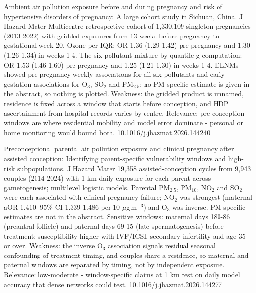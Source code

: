 \documentclass[10pt]{article}
\begin{document}
\par{}\baselineskip{}\baselineskip
{}

{Ambient air pollution exposure before and during pregnancy and risk of hypertensive disorders of pregnancy: A large cohort study in Sichuan, China.}
{J Hazard Mater}
{Multicentre retrospective cohort of 1,330,109 singleton pregnancies (2013-2022) with gridded exposures from 13 weeks before pregnancy to gestational week 20. Ozone per IQR: OR 1.36 (1.29-1.42) pre-pregnancy and 1.30 (1.26-1.34) in weeks 1-4. The six-pollutant mixture by quantile g-computation: OR 1.53 (1.46-1.60) pre-pregnancy and 1.25 (1.21-1.30) in weeks 1-4. DLNMs showed pre-pregnancy weekly associations for all six pollutants and early-gestation associations for O$_3$, SO$_2$ and PM$_{2.5}$; no PM-specific estimate is given in the abstract, so nothing is plotted. Weakness: the gridded product is unnamed, residence is fixed across a window that starts before conception, and HDP ascertainment from hospital records varies by centre. Relevance: pre-conception windows are where residential mobility and model error dominate - personal or home monitoring would bound both.}
{10.1016/j.jhazmat.2026.144240}

{Preconceptional parental air pollution exposure and clinical pregnancy after assisted conception: Identifying parent-specific vulnerability windows and high-risk subpopulations.}
{J Hazard Mater}
{19,358 assisted-conception cycles from 9,943 couples (2014-2024) with 1-km daily exposure for each parent across gametogenesis; multilevel logistic models. Parental PM$_{2.5}$, PM$_{10}$, NO$_2$ and SO$_2$ were each associated with clinical-pregnancy failure; NO$_2$ was strongest (maternal aOR 1.410, 95\% CI 1.339-1.486 per 10 $\mu$g\,m$^{-3}$) and O$_3$ was inverse. PM-specific estimates are not in the abstract. Sensitive windows: maternal days 180-86 (preantral follicle) and paternal days 69-15 (late spermatogenesis) before treatment; susceptibility higher with IVF/ICSI, secondary infertility and age 35 or over. Weakness: the inverse O$_3$ association signals residual seasonal confounding of treatment timing, and couples share a residence, so maternal and paternal windows are separated by timing, not by independent exposure. Relevance: low-moderate - window-specific claims at 1 km rest on daily model accuracy that dense networks could test.}
{10.1016/j.jhazmat.2026.144277}
\end{document}
